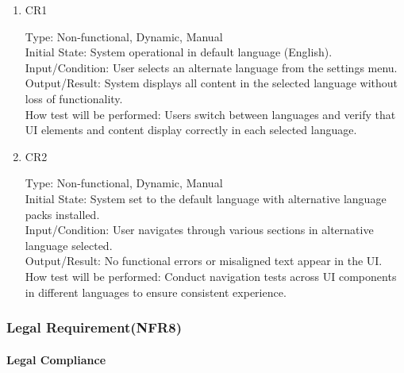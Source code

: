\documentclass[12pt, titlepage]{article}
\begin{document}
\begin{enumerate}
    \item{CR1\\}
    
    Type: Non-functional, Dynamic, Manual\\
    
    Initial State: System operational in default language (English).\\
    
    Input/Condition: User selects an alternate language from the settings menu.\\
    
    Output/Result: System displays all content in the selected language without loss of functionality.\\
    
    How test will be performed: Users switch between languages and verify that UI elements and content display correctly in each selected language.

    \item{CR2\\}
    
    Type: Non-functional, Dynamic, Manual\\
    
    Initial State: System set to the default language with alternative language packs installed.\\

    Input/Condition: User navigates through various sections in alternative language selected.\\
    
    Output/Result: No functional errors or misaligned text appear in the UI.\\
    
    How test will be performed: Conduct navigation tests across UI components in different languages to ensure consistent experience.
\end{enumerate}

\subsubsection{Legal Requirement(NFR8)}

\paragraph{Legal Compliance}
\end{document}
